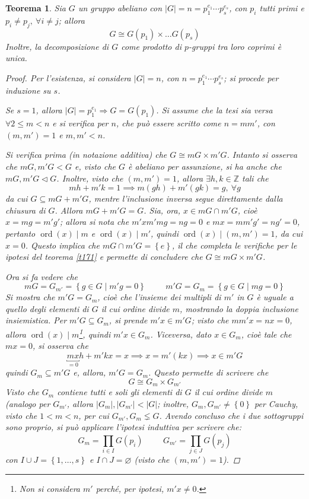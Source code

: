 \documentclass[11pt]{scrartcl}
\theoremstyle{style1}
\newtheorem{teorema}{Teorema}[section]
\numberwithin{equation}{subsection}
\begin{document}
\begin{teorema}\label{corts1}
	Sia $G$ un gruppo abeliano con $\lvert G \rvert = n = p_1^{e_1} \cdots p_s^{e_s}$, con $p_i$ tutti primi e $p_i\neq p_j, \ \forall i\neq j$; allora
	\[
	G \cong G(p_1) \times \ldots G(p_s)
	\] 
	Inoltre, la decomposizione di $G$ come prodotto di $p$-gruppi tra loro coprimi \`e unica.
	\begin{proof}
		Per l'esistenza, si considera $\lvert G \rvert =n$, con $n= p_1^{e_1}\cdots p_s^{e_s}$; si procede per induzione su $s$.

		Se $s=1$, allora $\lvert G \rvert =p_1^{e_1}\Rightarrow G=G(p_1)$.
		Si assume che la tesi sia versa $\forall 2\le m<n$ e si verifica per $n$, che pu\`o essere scritto come $n = m m'$, con $(m,m') = 1$ e $m,m' < n$.
		
		Si verifica prima (in notazione additiva) che $G \cong mG \times m' G$.
		Intanto si osserva che $mG,m'G < G$ e, visto che $G$ \`e abeliano per assunzione, si ha anche che $mG,m'G\lhd G$.
		Inoltre, visto che $(m,m') = 1$, allora $\exists h,k \in \mathbb{Z}$ tali che 
		\[
		mh + m'k =1 \implies m(gh) +m'(gk) =g, \ \forall g
		\] 
		da cui $G \subseteq mG + m'G$, mentre l'inclusione inversa segue direttamente dalla chiusura di $G$. 
		Allora $mG + m'G = G$.
		Sia, ora, $x \in mG \cap m'G$, cio\`e $x = mg = m'g'$; allora si nota che $m'x m'mg = ng = 0$ e $mx=mm'g' = ng' = 0$, pertanto $\operatorname{ord}(x)  \mid m$ e $\operatorname{ord}(x)  \mid m'$, quindi $\operatorname{ord}(x)  \mid (m,m') = 1$, da cui $x=0$.
		Questo implica che $mG\cap m'G = \left\{ e \right\} $, il che completa le verifiche per le ipotesi del teorema \ref{t171} e permette di concludere che $G \cong mG \times m'G$.

		Ora si fa vedere che 
		\[
		mG = G_{m'} = \left\{ g \in G  \mid m'g=0 \right\} \hspace{1cm} m'G = G_m = \left\{ g \in G \mid mg = 0 \right\} 
		\] 
		Si mostra che $m'G = G_m$, cio\`e che l'insieme dei multipli di $m'$ in $G$ \`e uguale a quello degli elementi di $G$ il cui ordine divide $m$, mostrando la doppia inclusione insiemistica.
		Per $m'G \subseteq G_m$, si prende $m'x \in m'G$; visto che $mm'x = n x = 0$, allora $\operatorname{ord}(x)  \mid m$\footnote{Non si considera $m'$ perch\'e, per ipotesi, $m'x\neq 0$.}, quindi $m'x \in G_m$.
		Viceversa, dato $x \in G_m$, cio\`e tale che $mx = 0$, si osserva che
		\[
			\underbracket{mx}_{=0} h + m'kx = x \implies x = m'(kx) \implies x \in  m'G
		\] 
		quindi $G_m \subseteq m'G$ e, allora, $m'G = G_m$.
		Questo permette di scrivere che 
		\[
		G \cong G_m \times G_{m'} 
		\] 
		Visto che $G_m$ contiene tutti e soli gli elementi di $G$ il cui ordine divide $m$ (analogo per $G_{m'} $, allora $\lvert G_m \rvert ,\lvert G_{m'}  \rvert < \lvert G \rvert $; inoltre, $G_{m} , G_{m'} \neq \left\{ 0 \right\} $ per Cauchy, visto che $1<m<n$, per cui $G_{m'},G_m \lneq G $.
		Avendo concluso che i due sottogruppi sono proprio, si pu\`o applicare l'ipotesi induttiva per scrivere che:
		\[
		G_m = \prod _{i\in I} G(p_i) \hspace{1cm}G_{m'} =\prod_{j \in J} G(p_j)
		\] 
		con $I\cup J = \left\{ 1, \ldots, s \right\} $ e $I\cap J = \varnothing$ (visto che $(m,m')=1$).


\end{proof}
\end{teorema}
\end{document}

